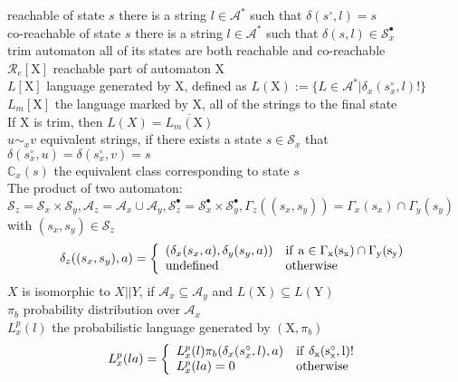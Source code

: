 \documentclass{article}
\begin{document}
reachable of state $s$ \quad there is a string $l\in\mathcal{A}^*$ such that $\delta(s^{\circ},l)=s$\\
co-reachable of state $s$ \quad there is a string $l\in\mathcal{A}^*$ such that $\delta(s,l) \in \mathcal{S}_x^{\bullet}$\\
trim automaton \quad all of its states are both reachable and co-reachable\\
$\mathcal{R}_e[\mathrm{X}]$ \quad reachable part of automaton $\mathrm{X}$\\
$L[\mathrm{X}]$ \quad language generated by $\mathrm{X}$, defined as $L(\mathrm{X}):=\{L\in\mathcal{A}^*|\delta_x(s_x^{\circ},l)!\}$\\
$L_m[\mathrm{X}]$ \quad the language marked by $\mathrm{X}$, all of the strings to the final state \\
If $\mathrm{X}$ is trim, then $L(X)=\overline{L_m(\mathrm{X})}$\\
$u\sim_xv$ \quad equivalent strings, if there exists a state $s\in\mathcal{S}_x$ that $\delta(s^{\circ}_x,u)=\delta(s^{\circ}_x,v)=s$\\
$\mathbb{C}_x(s)$ \quad the equivalent class corresponding to state $s$\\
The product of two automaton: $\mathcal{S}_{z}=\mathcal{S}_{x}\times\mathcal{S}_{y},\mathcal{A}_{z}=\mathcal{A}_{x}\cup\mathcal{A}_{y},\mathcal{S}_{z}^{\bullet}=\mathcal{S}_{x}^{\bullet}\times\mathcal{S}_{y}^{\bullet},\Gamma_{z}((s_{x},s_{y}))=\Gamma_{x}(s_{x})\cap \Gamma_{y}(s_y)$ with $(s_x,s_y)\in\mathcal{S}_z $\\
\begin{equation}
\left.\delta_z((s_x,s_y),a)=\left\{\begin{array}{ll}
\left(\delta_x(s_x,a),\delta_y(s_y,a)\right) & \rm{if} \ a \in \Gamma_x(s_x) \cap \Gamma_y(s_y)\\
\rm{undefined}&\rm{otherwise}\end{array}
\right.\right.
\end{equation}
$X$ is isomorphic to $X||Y$, if $\mathcal{A}_x \subseteq \mathcal{A}_y$ and $L(\mathrm{X})\subseteq L(\mathrm{Y})$\\
$\pi_b$ \quad probability distribution over $\mathcal{A}_x$\\
$L_x^p(l)$ \quad the probabilistic language generated by $(\mathrm{X},\pi_b)$\\
\begin{equation}
\left.L_{x}^p(la)=\left\{\begin{array}{ll}L_{x}^p(l)\pi_b(\delta_x(s_x^{\circ},l),a)& \rm{if}\ \delta_x(s_x^{\circ},l)!\\
L_{x}^p(la)=0& \rm{otherwise}\end{array}\right.\right.
\end{equation}
\end{document}
